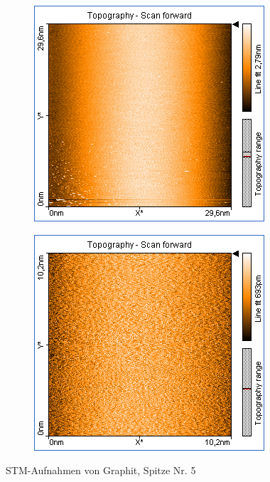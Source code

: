 \begin{figure}
\begin{subfigure}[b]{\picwidth}
        \caption{}
        \label{fig:graphit_02_02}
    \end{subfigure}
    \begin{subfigure}[b]{\picwidth}
        \includegraphics[width=\textwidth]{data/Graphit/pic_02_03_30nm}
        \caption{}
        \label{fig:graphit_02_03}
    \end{subfigure}\qquad
    \begin{subfigure}[b]{\picwidth}
        \includegraphics[width=\textwidth]{data/Graphit/pic_02_04_10nm}
        \caption{}
        \label{fig:graphit_02_04}
    \end{subfigure}
    \caption{STM-Aufnahmen von Graphit, Spitze Nr. 5}\label{fig:graphit_02}
\end{figure}

